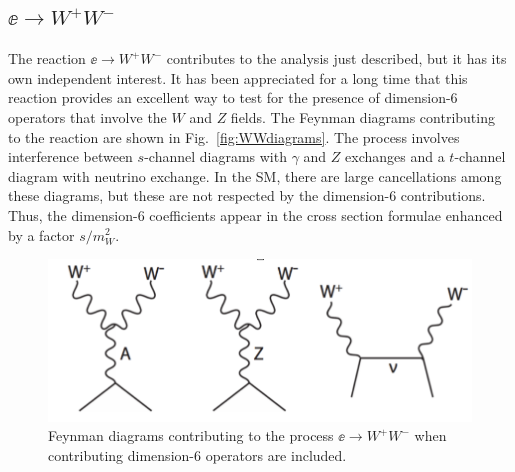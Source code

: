 \subsection{$\ee \to W^+W^-$}
\label{subsec:phys_WW}
The reaction $\ee\to W^+W^-$ contributes to the analysis just described, but it has its own independent interest.  It has been appreciated for  a long time that this reaction provides an excellent way to test for the presence of dimension-6 operators that involve the $W$ and $Z$ fields.   The Feynman diagrams contributing to the reaction are shown in Fig.~\ref{fig:WWdiagrams}.   The process involves interference between $s$-channel diagrams with $\gamma$ and $Z$ exchanges and a $t$-channel diagram with neutrino exchange.  In the SM, there are large cancellations among these diagrams, but these are not respected by the dimension-6 contributions.   Thus, the dimension-6 coefficients appear in the cross section formulae enhanced by a factor $s/m_W^2$. 

\begin{figure}
\begin{center}
\includegraphics[width=0.80\hsize]{chapters/figures/WWdiagrams.pdf}
\end{center}
\caption{Feynman diagrams contributing to the process $\ee\to W^+W^-$ when contributing  dimension-6 operators are included.}
\label{fig:eeWWdiagrams}
\end{figure}

